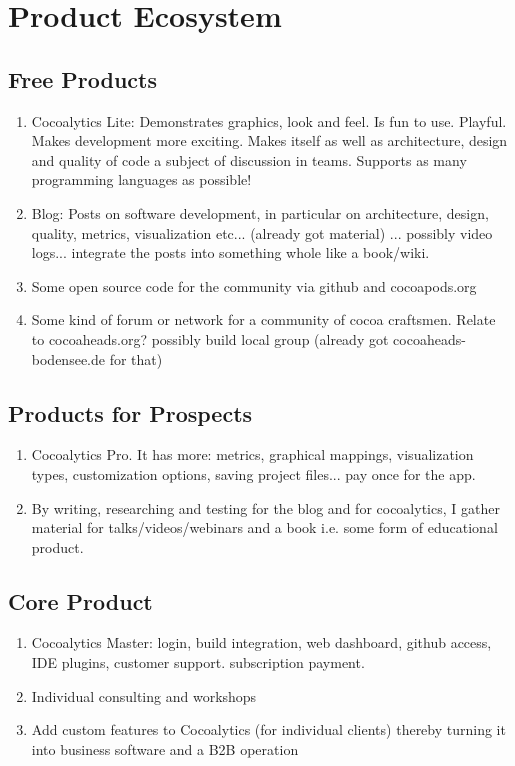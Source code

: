 \documentclass{article}
\begin{document}
\section{Product Ecosystem}

\subsection{Free Products}
\begin{enumerate}
	\item Cocoalytics Lite: Demonstrates graphics, look and feel. Is fun to use. Playful. Makes development more exciting. Makes itself as well as architecture, design and quality of code a subject of discussion in teams. Supports as many programming languages as possible!
	\item Blog: Posts on software development, in particular on architecture, design, quality, metrics, visualization etc... (already got material) ... possibly video logs... integrate the posts into something whole like a book/wiki.
	\item Some open source code for the community via github and cocoapods.org
	\item Some kind of forum or network for a community of cocoa craftsmen. Relate to cocoaheads.org? possibly build local group (already got cocoaheads-bodensee.de for that)
\end{enumerate}

\subsection{Products for Prospects}
\begin{enumerate}
	\item Cocoalytics Pro. It has more: metrics, graphical mappings, visualization types, customization options, saving project files... pay once for the app.
	\item By writing, researching and testing for the blog and for cocoalytics, I gather material for talks/videos/webinars and a book i.e. some form of educational product.
\end{enumerate}

\subsection{Core Product}
\begin{enumerate}
	\item Cocoalytics Master: login, build integration, web dashboard, github access, IDE plugins, customer support. subscription payment.
	\item Individual consulting and workshops
	\item Add custom features to Cocoalytics (for individual clients) thereby turning it into business software and a B2B operation
\end{enumerate}
\end{document}
